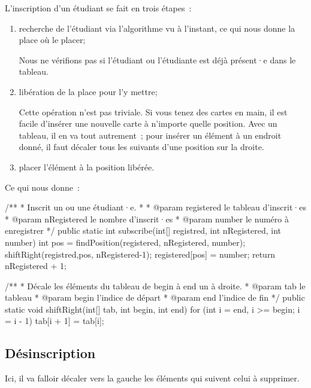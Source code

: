 			L’inscription d’un étudiant se fait en trois étapes~:
			\begin{enumerate}
			\item
				recherche de l’étudiant via l’algorithme vu à l'instant,
				ce qui nous donne la place où le placer;

				Nous ne vérifions pas si l'étudiant ou l'étudiante est déjà 
				présent·e dans le tableau. 

			\item
				libération de la place pour l’y mettre;
				
				Cette opération n’est pas triviale.  Si vous tenez des cartes en
				main, il est facile d’insérer une nouvelle carte à n’importe
				quelle position.  Avec un tableau, il en va tout autrement~;
				pour insérer un élément à un endroit donné, il faut décaler tous
				les suivants d’une position sur la droite.
			
			\item
				placer l’élément à la position libérée.
			\end{enumerate} 
			
			Ce qui nous donne~:
			
			\begin{java}
/**
 * Inscrit un ou une étudiant·e.
 * 
 * @param registered le tableau d'inscrit·es
 * @param nRegistered le nombre d'inscrit·es
 * @param number le numéro à enregistrer
 */
public static int subscribe(int[] registred, int nRegistered,
				int number){
	int pos = findPosition(registered, nRegistered, number);
	shiftRight(registred,pos, nRegistered-1);
	registered[pos] = number;
	return nRegistered + 1;
}

/**
 * Décale les éléments du tableau de begin à end un à droite.
 * @param tab le tableau
 * @param begin l'indice de départ
 * @param end l'indice de fin
 */
public static void shiftRight(int[] tab, int begin, int end){
	for (int i = end, i >= begin; i = i - 1){
		tab[i + 1] = tab[i];
	}
}
			\end{java}

			
		\subsection{Désinscription}
		
			Ici, il va falloir décaler vers la gauche
			les éléments qui suivent celui à supprimer.

